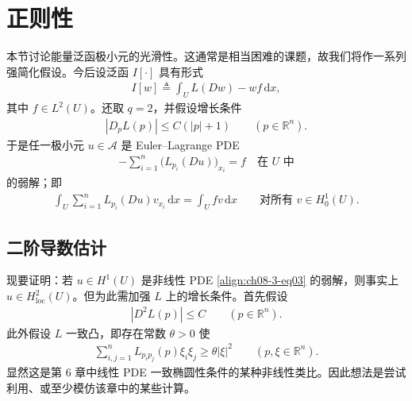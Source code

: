 \documentclass[../../main.tex]{subfiles}
\begin{document}
\section{正则性}\label{section:ch08-3-正则性}

本节讨论能量泛函极小元的光滑性。这通常是相当困难的课题，故我们将作一系列强简化假设。今后设泛函 $I[\cdot]$ 具有形式
\begin{align}
I[w]\triangleq\int_U L(Dw)-wf\,\mathrm{d}x,\label{align:ch08-3-eq01}
\end{align}
其中 $f\in L^2(U)$。还取 $q=2$，并假设增长条件
\begin{align}
|D_pL(p)|\leqslant C(|p|+1)\qquad (p\in\mathbb{R}^n).\label{align:ch08-3-eq02}
\end{align}
于是任一极小元 $u\in\mathcal{A}$ 是 Euler--Lagrange PDE
\begin{align}
-\sum_{i=1}^n\big(L_{p_i}(Du)\big)_{x_i}=f\quad\text{在 }U\text{ 中}\label{align:ch08-3-eq03}
\end{align}
的弱解；即
\begin{align}
\int_U\sum_{i=1}^n L_{p_i}(Du)v_{x_i}\,\mathrm{d}x=\int_U fv\,\mathrm{d}x\qquad\text{对所有 }v\in H_0^1(U).\label{align:ch08-3-eq04}
\end{align}

\subsection{二阶导数估计}\label{subsection:ch08-3-1-二阶导数估计}

现要证明：若 $u\in H^1(U)$ 是非线性 PDE \eqref{align:ch08-3-eq03} 的弱解，则事实上 $u\in H^2_{\mathrm{loc}}(U)$。但为此需加强 $L$ 上的增长条件。首先假设
\begin{align}
|D^2L(p)|\leqslant C\qquad (p\in\mathbb{R}^n).\label{align:ch08-3-eq05}
\end{align}
此外假设 $L$ 一致凸，即存在常数 $\theta>0$ 使
\begin{align}
\sum_{i,j=1}^n L_{p_ip_j}(p)\xi_i\xi_j\geqslant\theta|\xi|^2\qquad (p,\xi\in\mathbb{R}^n).\label{align:ch08-3-eq06}
\end{align}
显然这是第 6 章中线性 PDE 一致椭圆性条件的某种非线性类比。因此想法是尝试利用、或至少模仿该章中的某些计算。
\end{document}
